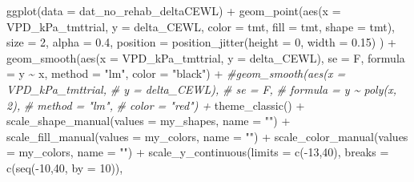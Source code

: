 \documentclass[
]{article}
\newenvironment{Shaded}{\begin{snugshade}}{\end{snugshade}}
\newcommand{\AttributeTok}[1]{\textcolor[rgb]{0.77,0.63,0.00}{#1}}
\newcommand{\CommentTok}[1]{\textcolor[rgb]{0.56,0.35,0.01}{\textit{#1}}}
\newcommand{\DecValTok}[1]{\textcolor[rgb]{0.00,0.00,0.81}{#1}}
\newcommand{\FloatTok}[1]{\textcolor[rgb]{0.00,0.00,0.81}{#1}}
\newcommand{\FunctionTok}[1]{\textcolor[rgb]{0.00,0.00,0.00}{#1}}
\newcommand{\NormalTok}[1]{#1}
\newcommand{\SpecialCharTok}[1]{\textcolor[rgb]{0.00,0.00,0.00}{#1}}
\newcommand{\StringTok}[1]{\textcolor[rgb]{0.31,0.60,0.02}{#1}}
\begin{document}
\begin{Shaded}
\begin{Highlighting}[]
\FunctionTok{ggplot}\NormalTok{(}\AttributeTok{data =}\NormalTok{ dat\_no\_rehab\_deltaCEWL) }\SpecialCharTok{+}
  \FunctionTok{geom\_point}\NormalTok{(}\FunctionTok{aes}\NormalTok{(}\AttributeTok{x =}\NormalTok{ VPD\_kPa\_tmttrial,}
                   \AttributeTok{y =}\NormalTok{ delta\_CEWL, }
                   \AttributeTok{color =}\NormalTok{ tmt,}
                 \AttributeTok{fill =}\NormalTok{ tmt,}
                 \AttributeTok{shape =}\NormalTok{ tmt), }
               \AttributeTok{size =} \DecValTok{2}\NormalTok{,}
              \AttributeTok{alpha =} \FloatTok{0.4}\NormalTok{,}
              \AttributeTok{position =} \FunctionTok{position\_jitter}\NormalTok{(}\AttributeTok{height =} \DecValTok{0}\NormalTok{, }\AttributeTok{width =} \FloatTok{0.15}\NormalTok{)}
\NormalTok{             ) }\SpecialCharTok{+}
  \FunctionTok{geom\_smooth}\NormalTok{(}\FunctionTok{aes}\NormalTok{(}\AttributeTok{x =}\NormalTok{ VPD\_kPa\_tmttrial,}
                   \AttributeTok{y =}\NormalTok{ delta\_CEWL), }
              \AttributeTok{se =}\NormalTok{ F,}
              \AttributeTok{formula =}\NormalTok{ y }\SpecialCharTok{\textasciitilde{}}\NormalTok{ x,}
              \AttributeTok{method =} \StringTok{"lm"}\NormalTok{,}
              \AttributeTok{color =} \StringTok{"black"}\NormalTok{) }\SpecialCharTok{+}
  \CommentTok{\#geom\_smooth(aes(x = VPD\_kPa\_tmttrial,}
   \CommentTok{\#                y = delta\_CEWL), }
    \CommentTok{\#          se = F,}
     \CommentTok{\#         formula = y \textasciitilde{} poly(x, 2),}
      \CommentTok{\#        method = "lm",}
       \CommentTok{\#       color = "red") +}
  \FunctionTok{theme\_classic}\NormalTok{() }\SpecialCharTok{+} 
  \FunctionTok{scale\_shape\_manual}\NormalTok{(}\AttributeTok{values =}\NormalTok{ my\_shapes, }\AttributeTok{name =} \StringTok{""}\NormalTok{) }\SpecialCharTok{+}
  \FunctionTok{scale\_fill\_manual}\NormalTok{(}\AttributeTok{values =}\NormalTok{ my\_colors, }\AttributeTok{name =} \StringTok{""}\NormalTok{) }\SpecialCharTok{+}
  \FunctionTok{scale\_color\_manual}\NormalTok{(}\AttributeTok{values =}\NormalTok{ my\_colors, }\AttributeTok{name =} \StringTok{""}\NormalTok{) }\SpecialCharTok{+}
  \FunctionTok{scale\_y\_continuous}\NormalTok{(}\AttributeTok{limits =} \FunctionTok{c}\NormalTok{(}\SpecialCharTok{{-}}\DecValTok{13}\NormalTok{,}\DecValTok{40}\NormalTok{),}
                     \AttributeTok{breaks =} \FunctionTok{c}\NormalTok{(}\FunctionTok{seq}\NormalTok{(}\SpecialCharTok{{-}}\DecValTok{10}\NormalTok{,}\DecValTok{40}\NormalTok{, }\AttributeTok{by =} \DecValTok{10}\NormalTok{)),}

\end{Highlighting}
\end{Shaded}
\end{document}
